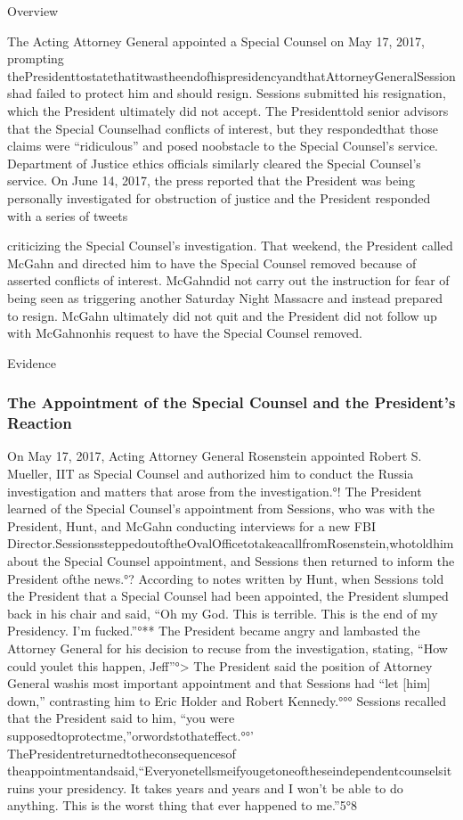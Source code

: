 {Overview

The Acting Attorney General appointed a Special Counsel on May 17, 2017, prompting thePresidenttostatethatitwastheendofhispresidencyandthatAttorneyGeneralSessionshad failed to protect him and should resign. Sessions submitted his resignation, which the President ultimately did not accept. The Presidenttold senior advisors that the Special Counselhad conflicts of interest, but they respondedthat those claims were “ridiculous” and posed noobstacle to the Special Counsel’s service. Department of Justice ethics officials similarly cleared the Special Counsel’s service. On June 14, 2017, the press reported that the President was being personally investigated for obstruction of justice and the President responded with a series of tweets

criticizing the Special Counsel’s investigation. That weekend, the President called McGahn and directed him to have the Special Counsel removed because of asserted conflicts of interest. McGahndid not carry out the instruction for fear of being seen as triggering another Saturday Night Massacre and instead prepared to resign. McGahn ultimately did not quit and the President did not follow up with McGahnonhis request to have the Special Counsel removed.

Evidence

\subsubsection{The Appointment of the Special Counsel and the President's Reaction}

On May 17, 2017, Acting Attorney General Rosenstein appointed Robert S. Mueller, IIT as Special Counsel and authorized him to conduct the Russia investigation and matters that arose from the investigation.°! The President learned of the Special Counsel’s appointment from Sessions, who was with the President, Hunt, and McGahn conducting interviews for a new FBI Director.SessionssteppedoutoftheOvalOfficetotakeacallfromRosenstein,whotoldhim about the Special Counsel appointment, and Sessions then returned to inform the President ofthe news.°? According to notes written by Hunt, when Sessions told the President that a Special Counsel had been appointed, the President slumped back in his chair and said, “Oh my God. This is terrible. This is the end of my Presidency. I’m fucked.”°** The President became angry and lambasted the Attorney General for his decision to recuse from the investigation, stating, “How could youlet this happen, Jeff”°> The President said the position of Attorney General washis most important appointment and that Sessions had “let [him] down,” contrasting him to Eric Holder and Robert Kennedy.°°° Sessions recalled that the President said to him, “you were supposedtoprotectme,”orwordstothateffect.°°’ ThePresidentreturnedtotheconsequencesof theappointmentandsaid,“Everyonetellsmeifyougetoneoftheseindependentcounselsitruins
your presidency. It takes years and years and I won’t be able to do anything. This is the worst thing that ever happened to me.”5°8

}
